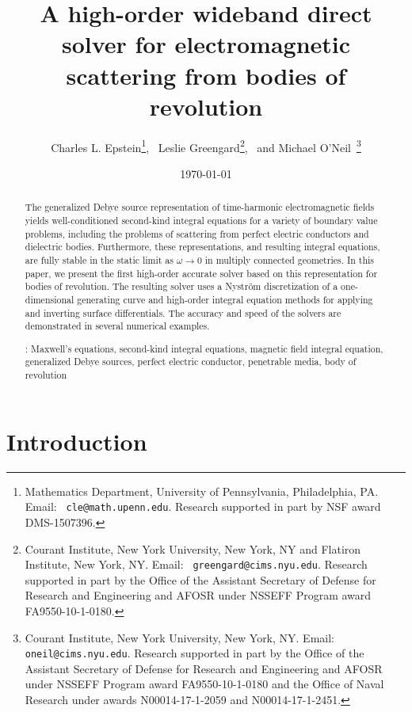 \documentclass[11pt]{article}
\title{\bf\sffamily A high-order wideband direct 
  solver for electromagnetic
  scattering from bodies of revolution}
\author{Charles L. Epstein\footnote{Mathematics Department, University
    of Pennsylvania, Philadelphia, PA. Email: {\tt
      cle@math.upenn.edu}.  Research supported in part by NSF award
     DMS-1507396.},
  \ Leslie Greengard\footnote{Courant Institute, New York University,
    New York, NY and Flatiron Institute, New York, NY.  Email: {\tt
      greengard@cims.nyu.edu}.  Research supported in part by
    the Office of the Assistant Secretary of Defense for Research and
    Engineering and AFOSR under NSSEFF Program award
    FA9550-10-1-0180.}, \ and Michael O'Neil~\footnote{Courant
    Institute, New York University, New York, NY. Email: {\tt
      oneil@cims.nyu.edu}.  Research supported in part by the
    Office of the Assistant Secretary of Defense for Research and
    Engineering and AFOSR under NSSEFF Program award FA9550-10-1-0180
    and the Office of Naval Research under awards N00014-17-1-2059 and
    N00014-17-1-2451.}}
\date{\today}
\numberwithin{equation}{section}
\begin{document}
\maketitle

\begin{abstract}
  The generalized Debye source representation of time-harmonic
  electromagnetic fields yields well-conditioned second-kind integral
  equations for a variety of boundary value problems, including
  the problems of scattering from perfect
  electric conductors and dielectric bodies.  Furthermore, these
  representations, and resulting integral equations, are fully stable
  in the static limit as $\omega \to 0$ in multiply connected
  geometries. In this paper, we present the
  first high-order accurate solver based on this representation for
  bodies of revolution.
  The resulting solver uses a Nystr\"om discretization of a one-dimensional
  generating curve and high-order integral equation methods for
   applying and inverting surface differentials.  The accuracy and
  speed of the solvers are demonstrated in several numerical examples.

  \vspace{.5\baselineskip}
  : Maxwell's equations, second-kind
  integral equations, magnetic field integral equation, 
  generalized Debye sources, perfect electric conductor, penetrable media,
  body of revolution
\end{abstract}







\section{Introduction}
\label{sec_intro}
\end{document}

